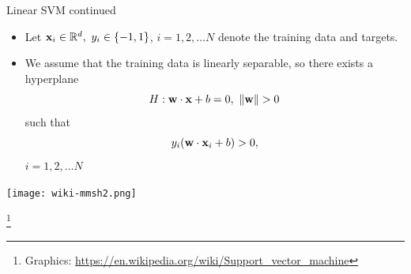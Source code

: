 \documentclass[handout]{beamer}   %
\def\R{\mathbb{R}}
\def\b#1{{\bf #1}}
\newcommand\blfootnote[1]{%
  \begingroup
  \renewcommand\thefootnote{}\footnote{#1}%
  \addtocounter{footnote}{-1}%
  \endgroup
}
\newcommand\graphics[1]{%
  \blfootnote{\hbox{}\hskip-0.6cm Graphics: \url{#1}}%
}
\begin{document}


\begin{frame}{Linear SVM continued}
  \begin{minipage}[c]{5.9cm}
    \begin{itemize}
    \item Let $\b x_i\in\R^d,\ y_i\in\{-1, 1\}$, $i=1,2,\ldots N$
      denote the training data and targets.

      \pause
    \item We assume that the training data is linearly
      separable, so there exists a hyperplane
      $$ H: \b w \cdot \b x + b = 0, \ \|\b w\| > 0$$
      such that
      $$ y_i(\b w \cdot \b x_i + b) > 0,$$
      $i=1,2,\ldots N$
    \end{itemize}
  \end{minipage}
  \hfil
  \begin{minipage}[c]{4.7cm}
    \texttt{[image: wiki-mmsh2.png]}
  \end{minipage}
  \graphics{https://en.wikipedia.org/wiki/Support_vector_machine}%
\end{frame}
\end{document}
